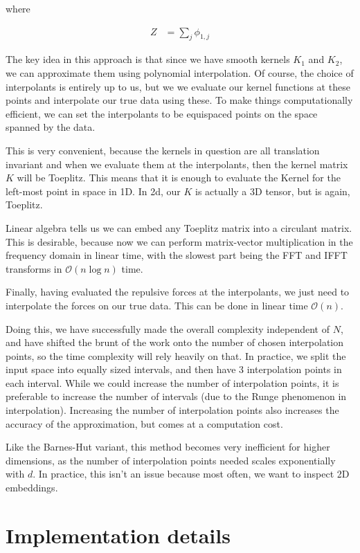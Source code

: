 \documentclass[11pt]{article}
\begin{document}
where

\begin{align}
Z &= \sum_j \phi_{1, j}
\end{align}

The key idea in this approach is that since we have smooth kernels $K_1$ and $K_2$, we can approximate them using polynomial interpolation. Of course, the choice of interpolants is entirely up to us, but we we evaluate our kernel functions at these points and interpolate our true data using these. To make things computationally efficient, we can set the interpolants to be equispaced points on the space spanned by the data.

This is very convenient, because the kernels in question are all translation invariant and when we evaluate them at the interpolants, then the kernel matrix $K$ will be Toeplitz. This means that it is enough to evaluate the Kernel for the left-most point in space in 1D. In 2d, our $K$ is actually a 3D tensor, but is again, Toeplitz.

Linear algebra tells us we can embed any Toeplitz matrix into a circulant matrix. This is desirable, because now we can perform matrix-vector multiplication in the frequency domain in linear time, with the slowest part being the FFT and IFFT transforms in $\mathcal{O}(n \log n)$ time.

Finally, having evaluated the repulsive forces at the interpolants, we just need to interpolate the forces on our true data. This can be done in linear time $\mathcal{O}(n)$.

Doing this, we have successfully made the overall complexity independent of $N$, and have shifted the brunt of the work onto the number of chosen interpolation points, so the time complexity will rely heavily on that. In practice, we split the input space into equally sized intervals, and then have 3 interpolation points in each interval. While we could increase the number of interpolation points, it is preferable to increase the number of intervals (due to the Runge phenomenon in interpolation). Increasing the number of interpolation points also increases the accuracy of the approximation, but comes at a computation cost.

Like the Barnes-Hut variant, this method becomes very inefficient for higher dimensions, as the number of interpolation points needed scales exponentially with $d$. In practice, this isn't an issue because most often, we want to inspect 2D embeddings.

\section{Implementation details}
\end{document}
